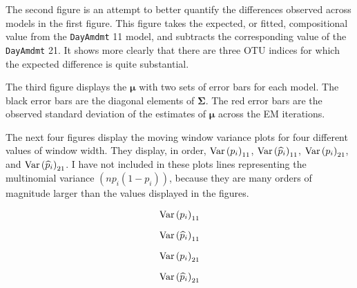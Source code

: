 \documentclass{template}
\begin{document}
The second figure is an attempt to better quantify the differences observed across models in the first figure. This figure takes the expected, or fitted, compositional value from the \texttt{DayAmdmt} 11  model, and subtracts the corresponding value of the \texttt{DayAmdmt} 21. It shows more clearly that there are three OTU indices for which the expected difference  is quite substantial.


The third figure displays the $\boldsymbol{\mu}$ with two sets of error bars for each model. The black error bars are the diagonal elements of $\boldsymbol{\Sigma}$. The red error bars are the observed standard deviation of the estimates of $\boldsymbol{\mu}$ across the EM iterations.


The next four figures display the moving window variance plots for four different values of window width. They display, in order, $\text{Var}\left(p_i\right)_{11}$, $\text{Var}\left(\widehat{p}_i\right)_{11}$, $\text{Var}\left(p_i\right)_{21}$, and $\text{Var}\left(\widehat{p}_i\right)_{21}$. I have not included in these plots lines representing the multinomial variance $(np_i(1-p_i))$, because they are many orders of magnitude larger than the values displayed in the figures.

\pagebreak
$$\text{Var}\left(p_i\right)_{11}$$


\pagebreak
$$\text{Var}\left(\widehat{p}_i\right)_{11}$$


\pagebreak
$$\text{Var}\left(p_i\right)_{21}$$


\pagebreak
$$\text{Var}\left(\widehat{p}_i\right)_{21}$$




\end{document}
